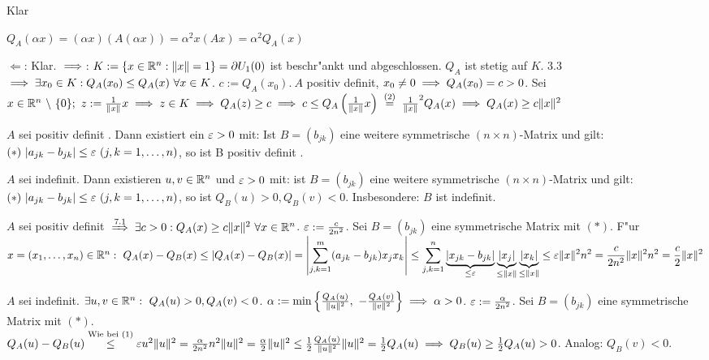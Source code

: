 \documentclass[a4paper,twoside,DIV15,BCOR12mm]{scrbook}
\begin{document}
\begin{beweise}
\item Klar
\item $Q_A(\alpha x)=(\alpha x)(A(\alpha x))=\alpha^2x(Ax)=\alpha^2Q_A(x)$
\item \glqq$\Leftarrow$\grqq: Klar. \glqq$\implies$\grqq: $K:=\{x\in\mathbb{R}^n: \|x\|=1\}=\partial U_1(0)$ ist beschr"ankt und abgeschlossen. $Q_A$ ist stetig auf $K$. 3.3 $\implies\exists x_0\in K: Q_A(x_0)\le Q_A(x)\ \forall x\in K$. $c:=Q_A(x_0).\ A$ positiv definit, $x_0\ne 0\implies Q_A(x_0)=c>0$. Sei $x\in\MdR^n\ \backslash\ \{0\};\ z:=\frac{1}{\|x\|}x\folgt z\in K\folgt Q_A(z)\ge c\folgt c \le Q_A\left(\frac{1}{\|x\|}x\right)\gleichnach{(2)}\frac{1}{\|x\|}^2Q_A(x)\folgt Q_A(x)\ge c\|x\|^2$
\end{beweise}

\begin{satz}
\begin{liste}
\item $A$ sei positiv definit . Dann existiert ein $\varepsilon>0$ mit: Ist $B=(b_{jk})$ eine weitere symmetrische $(n\times n)$-Matrix und gilt: $(*)\ |a_{jk}-b_{jk}|\le\ep\ (j,k=1,\ldots, n)$, so ist B positiv definit .
\item $A$ sei indefinit. Dann existieren $u,v\in\mathbb{R}^n$ und $\varepsilon>0$ mit: ist $B=(b_{jk})$ eine weitere symmetrische $(n\times n)$-Matrix und gilt: $(*)\ |a_{jk}-b_{jk}|\le\ep\ (j,k=1,\ldots,n)$, so ist $Q_B(u)>0, Q_B(v)<0$. Insbesondere: $B$ ist indefinit.
\end{liste}
\end{satz}

\begin{beweise}
\item $A$ sei positiv definit $\folgtnach{7.1}\exists c>0: Q_A(x)\ge c\|x\|^2\ \forall x\in\MdR^n$. $\varepsilon:=\frac{c}{2n^2}$. Sei $B=(b_{jk})$ eine symmetrische Matrix mit $(*)$. F"ur $x=(x_1,\ldots,x_n)\in\MdR^n:\ Q_A(x)-Q_B(x)\le|Q_A(x)-Q_B(x)|=\left|\ds\sum_{j,k=1}^m(a_{jk}-b_{jk})x_jx_k\right|\le\ds\sum_{j,k=1}^n\underbrace{|x_{jk}-b_{jk}|}_{\le\ep}\underbrace{|x_j|}_{\le\|x\|}\underbrace{|x_k|}_{\le\|x\|}\le\ep\|x\|^2n^2=\frac{c}{2n^2}\|x\|^2n^2=\frac{c}{2}\|x\|^2$
\item $A$ sei indefinit. $\exists u,v\in\MdR^n:\ Q_A(u)>0, Q_A(v)<0$. $\alpha:=\min\left\{\frac{Q_A(u)}{\|u\|^2},\ -\frac{Q_A(v)}{\|v\|^2}\right\}\folgt\alpha>0$. $\varepsilon:=\frac{\alpha}{2n^2}$. Sei $B=(b_{jk})$ eine symmetrische Matrix mit $(*)$.\\
$Q_A(u)-Q_B(u)\overset{\text{Wie bei (1)}}{\le}\varepsilon u^2\|u\|^2=\frac{\alpha}{2n^2}n^2\|u\|^2=\frac{\alpha}{2}\|u\|^2\le\frac{1}{2}\frac{Q_A(u)}{\|u\|^2}\|u\|^2=\frac{1}{2}Q_A(u) \implies Q_B(u)\ge\frac{1}{2}Q_A(u)>0$. Analog: $Q_B(v)<0$.
\end{beweise}
\end{document}
